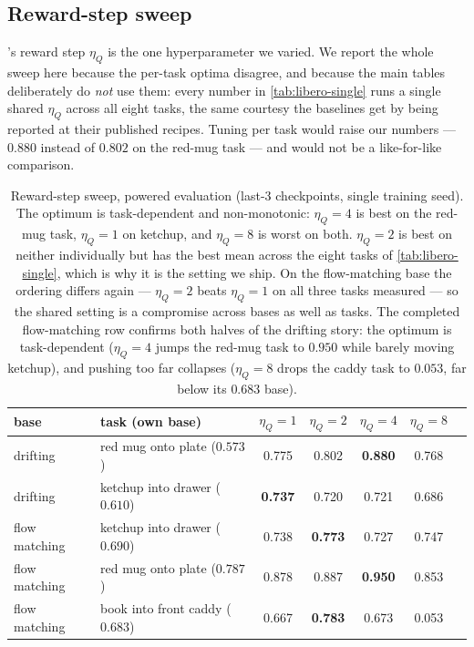 \subsection{Reward-step sweep}
\label{app:eta-sweep}

\method{}'s reward step $\eta_Q$ is the one hyperparameter we varied. We report
the whole sweep here because the per-task optima disagree, and because the main
tables deliberately do \emph{not} use them: every \method{} number in
\cref{tab:libero-single} runs a single shared $\eta_Q$ across all eight tasks,
the same courtesy the baselines get by being reported at their published
recipes. Tuning per task would raise our numbers --- $0.880$ instead of
$0.802$ on the red-mug task --- and would not be a like-for-like comparison.

\begin{table}[h]
\centering
\caption{Reward-step sweep, powered evaluation (last-3 checkpoints, single
training seed). The optimum is task-dependent and non-monotonic: $\eta_Q{=}4$
is best on the red-mug task, $\eta_Q{=}1$ on ketchup, and $\eta_Q{=}8$ is worst
on both. $\eta_Q{=}2$ is best on neither individually but has the best mean
across the eight tasks of \cref{tab:libero-single}, which is why it is the
setting we ship. On the flow-matching base the ordering differs again ---
$\eta_Q{=}2$ beats $\eta_Q{=}1$ on all three tasks measured --- so the shared
setting is a compromise across bases as well as tasks. The completed
flow-matching row confirms both halves of the drifting story: the optimum is
task-dependent ($\eta_Q{=}4$ jumps the red-mug task to $0.950$ while barely
moving ketchup), and pushing too far collapses ($\eta_Q{=}8$ drops the caddy
task to $0.053$, far below its $0.683$ base).}
\label{tab:eta-sweep}
\small
\begin{tabular}{llccccc}
\toprule
base & task (own base) & $\eta_Q{=}1$ & $\eta_Q{=}2$ & $\eta_Q{=}4$ & $\eta_Q{=}8$ \\
\midrule
drifting & red mug onto plate ($0.573$)   & 0.775 & 0.802 & \textbf{0.880} & 0.768 \\
drifting & ketchup into drawer ($0.610$)  & \textbf{0.737} & 0.720 & 0.721 & 0.686 \\
\midrule
flow matching & ketchup into drawer ($0.690$)     & 0.738 & \textbf{0.773} & 0.727 & 0.747 \\
flow matching & red mug onto plate ($0.787$)      & 0.878 & 0.887 & \textbf{0.950} & 0.853 \\
flow matching & book into front caddy ($0.683$)   & 0.667 & \textbf{0.783} & 0.673 & 0.053 \\
\bottomrule
\end{tabular}
\end{table}

